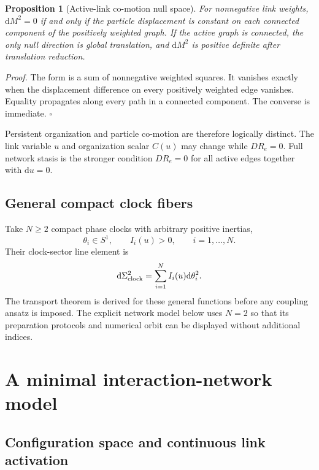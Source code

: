 \documentclass[11pt]{article}
\theoremstyle{plain}
\newtheorem{proposition}[theorem]{Proposition}
\newcommand{\dd}{\mathrm d}
\newcommand{\QED}{\hfill$\square$}
\begin{document}
\begin{proposition}[Active-link co-motion null space]
For nonnegative link weights, $\dd M^2=0$ if and only if the particle displacement is constant on each connected component of the positively weighted graph. If the active graph is connected, the only null direction is global translation, and $\dd M^2$ is positive definite after translation reduction.
\end{proposition}
\noindent\emph{Proof.} The form is a sum of nonnegative weighted squares. It vanishes exactly when the displacement difference on every positively weighted edge vanishes. Equality propagates along every path in a connected component. The converse is immediate. \QED

Persistent organization and particle co-motion are therefore logically distinct. The link variable $u$ and organization scalar $C(u)$ may change while $DR_e=0$. Full network stasis is the stronger condition $DR_e=0$ for all active edges together with $\dd u=0$.

\subsection{General compact clock fibers}

Take $N\ge2$ compact phase clocks with arbitrary positive inertias,
\begin{equation}
 \theta_i\in S^1,\qquad I_i(u)>0,
 \qquad i=1,\ldots,N.
\end{equation}
Their clock-sector line element is
\begin{equation}
 \dd\Sigma_{\rm clock}^2
 =\sum_{i=1}^{N}I_i(u)\dd\theta_i^2.
\end{equation}
The transport theorem is derived for these general functions before any
coupling ansatz is imposed.  The explicit network model below uses $N=2$ so
that its preparation protocols and numerical orbit can be displayed without
additional indices.

\section{A minimal interaction-network model}

\subsection{Configuration space and continuous link activation}
\end{document}
